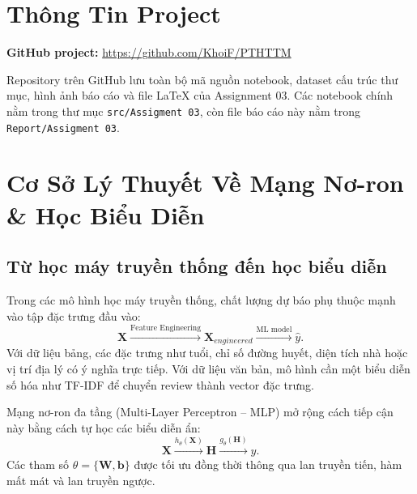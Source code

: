 \documentclass[12pt,a4paper]{report}
\newcommand{\modelpath}[1]{\texttt{#1}}
\begin{document}
\tableofcontents
\newpage
\listoffigures
\newpage
\listoftables
\newpage
{}

\chapter*{Thông Tin Project}

\noindent\textbf{GitHub project:} \url{https://github.com/KhoiF/PTHTTM}

\vspace{0.4cm}
\noindent
Repository trên GitHub lưu toàn bộ mã nguồn notebook, dataset cấu trúc thư mục, hình ảnh báo cáo và file \LaTeX{} của Assignment 03.
Các notebook chính nằm trong thư mục \modelpath{src/Assigment 03}, còn file báo cáo này nằm trong \modelpath{Report/Assigment 03}.
\newpage

\chapter{Cơ Sở Lý Thuyết Về Mạng Nơ-ron \& Học Biểu Diễn}

\section{Từ học máy truyền thống đến học biểu diễn}
Trong các mô hình học máy truyền thống, chất lượng dự báo phụ thuộc mạnh vào tập đặc trưng đầu vào:
\begin{equation}
    \mathbf{X} \xrightarrow{\text{Feature Engineering}} \mathbf{X}_{engineered}
    \xrightarrow{\text{ML model}} \hat{y}.
\end{equation}
Với dữ liệu bảng, các đặc trưng như tuổi, chỉ số đường huyết, diện tích nhà hoặc vị trí địa lý có ý nghĩa trực tiếp. Với dữ liệu văn bản, mô hình cần một biểu diễn số hóa như TF-IDF để chuyển review thành vector đặc trưng.

Mạng nơ-ron đa tầng (Multi-Layer Perceptron -- MLP) mở rộng cách tiếp cận này bằng cách tự học các biểu diễn ẩn:
\begin{equation}
    \mathbf{X} \xrightarrow{h_{\theta}(\mathbf{X})} \mathbf{H}
    \xrightarrow{g_{\theta}(\mathbf{H})} \hat{y}.
\end{equation}
Các tham số $\theta = \{\mathbf{W}, \mathbf{b}\}$ được tối ưu đồng thời thông qua lan truyền tiến, hàm mất mát và lan truyền ngược.
\end{document}
